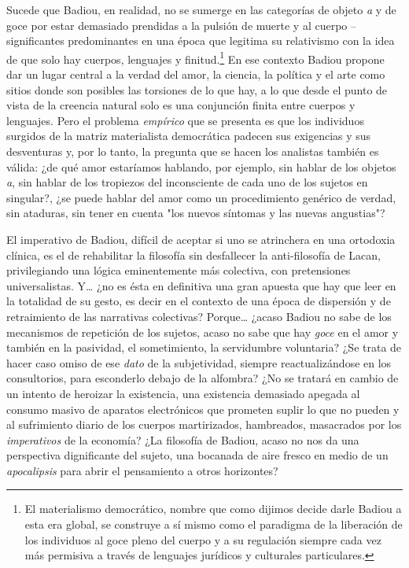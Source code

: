 Sucede que Badiou, en realidad, no se sumerge en las categorías de
objeto \emph{a} y de goce por estar demasiado prendidas a la pulsión de
muerte y al cuerpo --significantes predominantes en una época que
legitima su relativismo con la idea de que solo hay cuerpos, lenguajes y
finitud.\footnote{El materialismo democrático, nombre que como dijimos
  decide darle Badiou a esta era global, se construye a sí mismo como el
  paradigma de la liberación de los individuos al goce pleno del cuerpo
  y a su regulación siempre cada vez más permisiva a través de lenguajes
  jurídicos y culturales particulares.} En ese contexto Badiou propone
dar un lugar central a la verdad del amor, la ciencia, la política y el
arte como sitios donde son posibles las torsiones de lo que hay, a lo
que desde el punto de vista de la creencia natural solo es una
conjunción finita entre cuerpos y lenguajes. Pero el problema
\emph{empírico} que se presenta es que los individuos surgidos de la
matriz materialista democrática padecen sus exigencias y sus desventuras
y, por lo tanto, la pregunta que se hacen los analistas también es
válida: ¿de qué amor estaríamos hablando, por ejemplo, sin hablar de los
objetos \emph{a}, sin hablar de los tropiezos del inconsciente de cada
uno de los sujetos en singular?, ¿se puede hablar del amor como un
procedimiento genérico de verdad, sin ataduras, sin tener en cuenta "los
nuevos síntomas y las nuevas angustias"?

El imperativo de Badiou, difícil de aceptar si uno se atrinchera en una
ortodoxia clínica, es el de rehabilitar la filosofía sin desfallecer la
anti-filosofía de Lacan, privilegiando una lógica eminentemente más
colectiva, con pretensiones universalistas. Y\ldots{} ¿no es ésta en
definitiva una gran apuesta que hay que leer en la totalidad de su
gesto, es decir en el contexto de una época de dispersión y de
retraimiento de las narrativas colectivas? Porque\ldots{} ¿acaso Badiou
no sabe de los mecanismos de repetición de los sujetos, acaso no sabe
que hay \emph{goce} en el amor y también en la pasividad, el
sometimiento, la servidumbre voluntaria? ¿Se trata de hacer caso omiso
de ese \emph{dato} de la subjetividad, siempre reactualizándose en los
consultorios, para esconderlo debajo de la alfombra? ¿No se tratará en
cambio de un intento de heroizar la existencia, una existencia demasiado
apegada al consumo masivo de aparatos electrónicos que prometen suplir
lo que no pueden y al sufrimiento diario de los cuerpos martirizados,
hambreados, masacrados por los \emph{imperativos} de la economía? ¿La
filosofía de Badiou, acaso no nos da una perspectiva dignificante del
sujeto, una bocanada de aire fresco en medio de un \emph{apocalipsis}
para abrir el pensamiento a otros horizontes?

